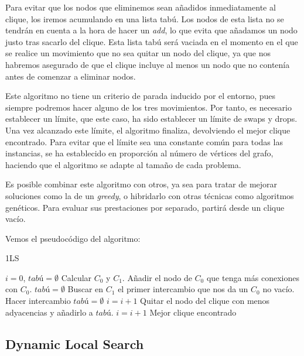 Para evitar que los nodos que eliminemos sean añadidos inmediatamente al clique, los iremos
acumulando en una lista tabú. Los nodos de esta lista no se tendrán en cuenta a la hora de
hacer un \textit{add}, lo que evita que añadamos un nodo justo tras sacarlo del clique.
Esta lista tabú será vaciada en el momento en el que se realice un movimiento que no sea
quitar un nodo del clique, ya que nos habremos asegurado de que el clique incluye al menos
un nodo que no contenía antes de comenzar a eliminar nodos.

Este algoritmo no tiene un criterio de parada inducido por el entorno, pues siempre podremos
hacer alguno de los tres movimientos. Por tanto, es necesario establecer un límite, que este
caso, ha sido establecer un límite de swaps y drops. Una vez alcanzado este límite, el algoritmo
finaliza, devolviendo el mejor clique encontrado. Para evitar que el límite sea una constante
común para todas las instancias, se ha establecido en proporción al número de vértices del grafo,
haciendo que el algoritmo se adapte al tamaño de cada problema.

Es posible combinar este algoritmo con otros, ya sea para tratar de mejorar soluciones
como la de un \textit{greedy}, o hibridarlo con otras técnicas como algoritmos
genéticos. Para evaluar sus prestaciones por separado, partirá desde un clique vacío.

Vemos el pseudocódigo del algoritmo:

\begin{algorithm}[H]
\caption{1LS}
  \begin{algorithmic}
    \State $i = 0$, $tabú = \emptyset$
    \State Calcular $C_0$ y $C_1$.
    \Repeat
        \State Añadir el nodo de $C_0$ que tenga más conexiones con $C_0$.
        \State $tabú = \emptyset$
      \Else
        \State Buscar en $C_1$ el primer intercambio que nos da un $C_0$ no vacío.
          \State Hacer intercambio
          \State $tabú = \emptyset$
          \State $i = i + 1$
        \Else
          \State Quitar el nodo del clique con menos adyacencias y añadirlo a $tabú$.
          \State $i = i + 1$
        \EndIf
      \EndIf
    \Return Mejor clique encontrado
    \EndFunction
  \end{algorithmic}
\end{algorithm}

\subsection{Dynamic Local Search}\label{dls}

